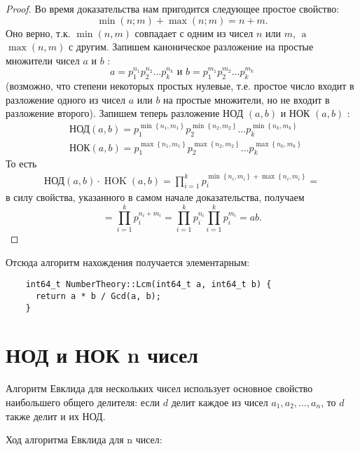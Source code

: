 \documentclass[12pt, a4paper, openany]{book}
\begin{document}
\begin{proof}
    \noindent
    Во время доказательства нам пригодится следующее простое свойство:
    $$
    \min (n ; m)+\max (n ; m)=n+m .
    $$
    \noindent
    Оно верно, т.к. $\min (n, m)$ совпадает с одним из чисел $n$ или $m$, $\operatorname{a }$ $\max (n, m)$ с другим.
    Запишем каноническое разложение на простые множители чисел $a$ и $b$ :
    $$
    a=p_1^{n_1} p_2^{n_2} \ldots p_k^{n_k} \text { и } b=p_1^{m_1} p_2^{m_2} \ldots p_k^{m_k}
    $$
    (возможно, что степени некоторых простых нулевые, т.е. простое число входит в разложение одного из чисел $a$ или $b$ на простые множители, но не входит в разложение второго). Запишем теперь разложение НОД $(a, b)$ и НОК $(a, b)$ :
    $$
    \begin{aligned}
    & \text {НОД}(a, b)=p_1^{\min \left\{n_1, m_1\right\}} p_2^{\min \left\{n_2, m_2\right\}} \ldots p_k^{\min \left\{n_k, m_k\right\}} \\
    & \text {НОК}(a, b)=p_1^{\max \left\{n_1, m_1\right\}} p_2^{\max \left\{n_2, m_2\right\}} \ldots p_k^{\max \left\{n_k, m_k\right\}}
    \end{aligned}
    $$
    \noindent
    То есть
    $$
    \begin{gathered}
    \text {НОД}(a, b) \cdot \operatorname{HOK}(a, b)=\prod_{i=1}^k p_i^{\min \left\{n_i, m_i\right\}+\max \left\{n_i, m_i\right\}}=
    \end{gathered}
    $$
    \noindent
    в силу свойства, указанного в самом начале доказательства, получаем
    $$
    =\prod_{i=1}^k p_i^{n_i + m_i}=\prod_{i=1}^k p_i^{n_i}\prod_{i=1}^k p_i^{m_i}=a b .
    $$
\end{proof}

\newpage
\noindent
    Отсюда алгоритм нахождения получается элементарным:
\begin{lstlisting}
    int64_t NumberTheory::Lcm(int64_t a, int64_t b) {
      return a * b / Gcd(a, b);
    }
\end{lstlisting}

\section{НОД и НОК n чисел}

    Алгоритм Евклида для нескольких чисел использует основное свойство наибольшего общего делителя: если $d$ делит каждое из чисел $a_1, a_2, …, a_n$, то $d$ также делит и их НОД.
    
\vspace{12pt}\noindent
    Ход алгоритма Евклида для n чисел:
\end{document}
